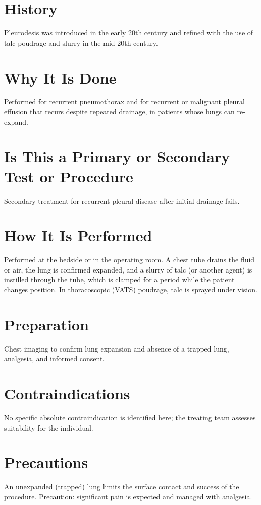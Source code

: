 \section*{History}
Pleurodesis was introduced in the early 20th century and refined with the use of talc poudrage and slurry in the mid-20th century.

\section*{Why It Is Done}
Performed for recurrent pneumothorax and for recurrent or malignant pleural effusion that recurs despite repeated drainage, in patients whose lungs can re-expand.

\section*{Is This a Primary or Secondary Test or Procedure}
Secondary treatment for recurrent pleural disease after initial drainage fails.

\section*{How It Is Performed}
Performed at the bedside or in the operating room. A chest tube drains the fluid or air, the lung is confirmed expanded, and a slurry of talc (or another agent) is instilled through the tube, which is clamped for a period while the patient changes position. In thoracoscopic (VATS) poudrage, talc is sprayed under vision.

\section*{Preparation}
Chest imaging to confirm lung expansion and absence of a trapped lung, analgesia, and informed consent.

\section*{Contraindications}
No specific absolute contraindication is identified here; the treating team assesses suitability for the individual.

\section*{Precautions}
An unexpanded (trapped) lung limits the surface contact and success of the procedure. Precaution: significant pain is expected and managed with analgesia.

